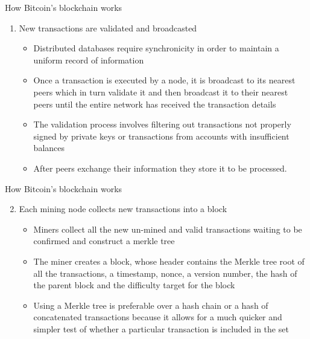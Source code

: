 \documentclass[10pt]{beamer}
\begin{document}

\begin{frame}{How Bitcoin's blockchain works}
	\begin{enumerate}
		\item New transactions are validated and broadcasted
			\begin{itemize}
				\item Distributed databases require synchronicity in order to maintain a uniform record of information
				\item Once a transaction is executed by a node, it is broadcast to its nearest peers which in turn validate it and then broadcast it to their nearest peers until the entire network has received the transaction details
				\item The validation process involves filtering out transactions not properly signed by private keys or transactions from accounts with insufficient balances
				\item After peers exchange their information they store it to be processed.
			\end{itemize}
	\end{enumerate}
\end{frame}


\begin{frame}{How Bitcoin's blockchain works}
	\begin{enumerate}
		\setcounter{enumi}{1}
		\item Each mining node collects new transactions into a block
		\begin{itemize}
			\item Miners collect all the new un-mined and valid transactions waiting to be confirmed and construct a merkle tree
			\item The miner creates a block, whose header contains the Merkle tree root of all the transactions, a timestamp, nonce, a version number, the hash of the parent block and the difficulty target for the block
			\item Using a Merkle tree is preferable over a hash chain or a hash of concatenated transactions because it allows for a much quicker and simpler test of whether a particular transaction is included in the set
		\end{itemize}
	\end{enumerate}
\end{frame}
\end{document}
